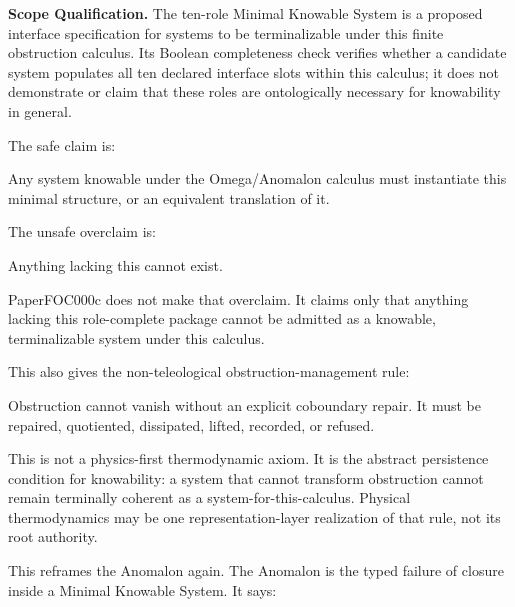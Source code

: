 \documentclass[
  10pt,
]{article}
\newenvironment{Shaded}{}{}
\newcommand{\NormalTok}[1]{#1}
\begin{document}
\textbf{Scope Qualification.} The ten-role Minimal Knowable System is a proposed interface specification for systems to be terminalizable under this finite obstruction calculus. Its Boolean completeness check verifies whether a candidate system populates all ten declared interface slots within this calculus; it does not demonstrate or claim that these roles are ontologically necessary for knowability in general.

The safe claim is:

\begin{Shaded}
\begin{Highlighting}[]
\NormalTok{Any system knowable under the Omega/Anomalon calculus must instantiate this minimal structure, or an equivalent translation of it.}
\end{Highlighting}
\end{Shaded}

The unsafe overclaim is:

\begin{Shaded}
\begin{Highlighting}[]
\NormalTok{Anything lacking this cannot exist.}
\end{Highlighting}
\end{Shaded}

PaperFOC000c does not make that overclaim. It claims only that anything lacking this role-complete package cannot be admitted as a knowable, terminalizable system under this calculus.

This also gives the non-teleological obstruction-management rule:

\begin{Shaded}
\begin{Highlighting}[]
\NormalTok{Obstruction cannot vanish without an explicit coboundary repair.}
\NormalTok{It must be repaired, quotiented, dissipated, lifted, recorded, or refused.}
\end{Highlighting}
\end{Shaded}

This is not a physics-first thermodynamic axiom. It is the abstract persistence condition for knowability: a system that cannot transform obstruction cannot remain terminally coherent as a system-for-this-calculus. Physical thermodynamics may be one representation-layer realization of that rule, not its root authority.

This reframes the Anomalon again. The Anomalon is the typed failure of closure inside a Minimal Knowable System. It says:
\end{document}
